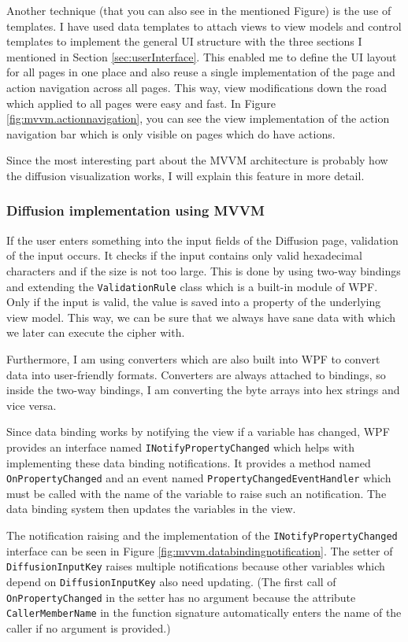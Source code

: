 Another technique (that you can also see in the mentioned Figure) is the use of templates. I have used data templates to attach views to view models and control templates to implement the general UI structure with the three sections I mentioned in Section \ref{sec:userInterface}. This enabled me to define the UI layout for all pages in one place and also reuse a single implementation of the page and action navigation across all pages. This way, view modifications down the road which applied to all pages were easy and fast. In Figure \ref{fig:mvvm.actionnavigation}, you can see the view implementation of the action navigation bar which is only visible on pages which do have actions.

Since the most interesting part about the MVVM architecture is probably how the diffusion visualization works, I will explain this feature in more detail.

\subsubsection{Diffusion implementation using MVVM}

If the user enters something into the input fields of the Diffusion page, validation of the input occurs. It checks if the input contains only valid hexadecimal characters and if the size is not too large. This is done by using two-way bindings and extending the \texttt{ValidationRule} class which is a built-in module of WPF. Only if the input is valid, the value is saved into a property of the underlying view model. This way, we can be sure that we always have sane data with which we later can execute the cipher with.

Furthermore, I am using converters which are also built into WPF to convert data into user-friendly formats. Converters are always attached to bindings, so inside the two-way bindings, I am converting the byte arrays into hex strings and vice versa.

Since data binding works by notifying the view if a variable has changed, WPF provides an interface named \texttt{INotifyPropertyChanged} which helps with implementing these data binding notifications. It provides a method named \texttt{OnPropertyChanged} and  an event named \texttt{PropertyChangedEventHandler} which must be called with the name of the variable to raise such an notification. The data binding system then updates the variables in the view.

The notification raising and the implementation of the \texttt{INotifyPropertyChanged} interface can be seen in Figure \ref{fig:mvvm.databindingnotification}. The setter of \texttt{DiffusionInputKey} raises multiple notifications because other variables which depend on \texttt{DiffusionInputKey} also need updating. (The first call of \texttt{OnPropertyChanged}  in the setter has no argument because the attribute \texttt{CallerMemberName} in the function signature automatically enters the name of the caller if no argument is provided.)

